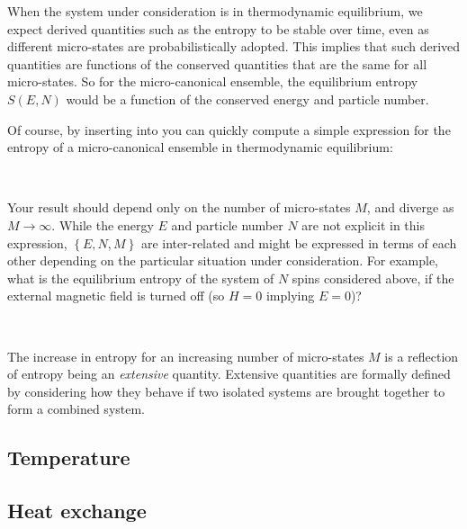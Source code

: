 When the system under consideration is in thermodynamic equilibrium, we expect derived quantities such as the entropy to be stable over time, even as different micro-states are probabilistically adopted.
This implies that such derived quantities are functions of the conserved quantities that are the same for all micro-states.
So for the micro-canonical ensemble, the equilibrium entropy $S(E, N)$ would be a function of the conserved energy and particle number.

Of course, by inserting  into  you can quickly compute a simple expression for the entropy of a micro-canonical ensemble in thermodynamic equilibrium:
\begin{mdframed}
  \ \\[100 pt]
\end{mdframed}
\newpage %
\noindent Your result should depend only on the number of micro-states $M$, and diverge as $M \to \infty$.
While the energy $E$ and particle number $N$ are not explicit in this expression, $\left\{E, N, M\right\}$ are inter-related and might be expressed in terms of each other depending on the particular situation under consideration.
For example, what is the equilibrium entropy of the system of $N$ spins considered above, if the external magnetic field is turned off (so $H = 0$ implying $E = 0$)?
\begin{mdframed}
  \ \\[100 pt]
\end{mdframed}

The increase in entropy for an increasing number of micro-states $M$ is a reflection of entropy being an \textit{extensive} quantity. %
Extensive quantities are formally defined by considering how they behave if two isolated systems are brought together to form a combined system.




\newpage %
\subsection{Temperature}



\newpage %
\subsection{Heat exchange}
